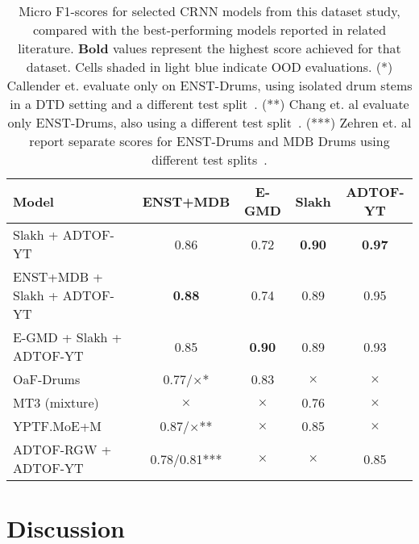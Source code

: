 \begin{table}[H]
    \centering
    \hspace*{-0.6cm}
    \begin{tabular}{l|cccc}
        Model & ENST+MDB & E-GMD & Slakh & ADTOF-YT      \\
        \hline
        Slakh + ADTOF-YT & \cellcolor{blue!5} 0.86	& \cellcolor{blue!5} 0.72 & \textbf{0.90}	& \textbf{0.97} \\
        ENST+MDB + Slakh + ADTOF-YT & \textbf{0.88}	& 0.74 & \cellcolor{blue!5} 0.89	& 0.95 \\
        E-GMD + Slakh + ADTOF-YT & \cellcolor{blue!5} 0.85 & \textbf{0.90} & 0.89 & 0.93 \\
        \hline
        OaF-Drums~\cite{callender2020improvingperceptualqualitydrum} & \cellcolor{blue!5} 0.77/$\times$* & 0.83 & $\times$ & $\times$ \\
        \hline
        MT3 (mixture)~\cite{gardner2022mt3multitaskmultitrackmusic} & $\times$ & $\times$ & 0.76 & $\times$ \\
        \hline
        YPTF.MoE+M~\cite{chang2024yourmt3+} & 0.87/$\times$** & $\times$ & 0.85 & $\times$ \\
        \hline
        ADTOF-RGW + ADTOF-YT~\cite{signals4040042} & \cellcolor{blue!5}0.78/0.81*** & $\times$ & $\times$ & 0.85 \\
    \end{tabular}
    \caption{Micro F1-scores for selected \acrlong{CRNN} models from this dataset study, compared with the best-performing models reported in related literature. \textbf{Bold} values represent the highest score achieved for that dataset. Cells shaded in \colorbox{blue!10}{light blue} indicate \acrshort{OOD} evaluations. \newline
    (*) Callender et. evaluate only on ENST-Drums, using isolated drum stems in a \gls{DTD} setting and a different test split~\cite{callender2020improvingperceptualqualitydrum}. \newline
    (**) Chang et. al evaluate only ENST-Drums, also using a different test split~\cite{chang2024yourmt3+}. \newline
    (***) Zehren et. al report separate scores for ENST-Drums and MDB Drums using different test splits~\cite{signals4040042}.
    }
    \label{DatasetComparisonTable}
\end{table}

\section{Discussion}

